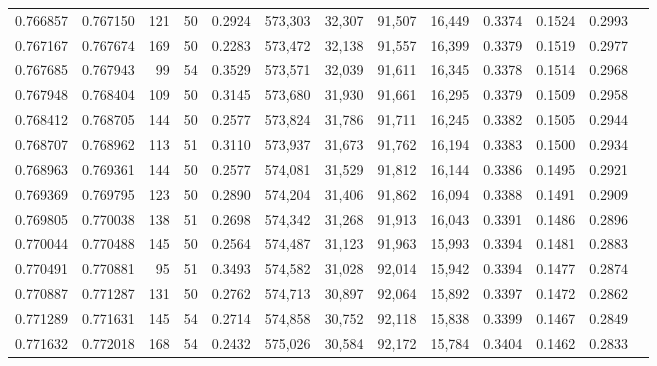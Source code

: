 \begin{tabular}{rrrrrrrrrrrrr}
0.766857 & 0.767150 &   121 &  50 &                                     0.2924 & 573,303 &  32,307 &  91,507 &  16,449 & 0.3374 & 0.1524 & 0.2993 \\
0.767167 & 0.767674 &   169 &  50 &                                     0.2283 & 573,472 &  32,138 &  91,557 &  16,399 & 0.3379 & 0.1519 & 0.2977 \\
0.767685 & 0.767943 &    99 &  54 &                                     0.3529 & 573,571 &  32,039 &  91,611 &  16,345 & 0.3378 & 0.1514 & 0.2968 \\
0.767948 & 0.768404 &   109 &  50 &                                     0.3145 & 573,680 &  31,930 &  91,661 &  16,295 & 0.3379 & 0.1509 & 0.2958 \\
0.768412 & 0.768705 &   144 &  50 &                                     0.2577 & 573,824 &  31,786 &  91,711 &  16,245 & 0.3382 & 0.1505 & 0.2944 \\
0.768707 & 0.768962 &   113 &  51 &                                     0.3110 & 573,937 &  31,673 &  91,762 &  16,194 & 0.3383 & 0.1500 & 0.2934 \\
0.768963 & 0.769361 &   144 &  50 &                                     0.2577 & 574,081 &  31,529 &  91,812 &  16,144 & 0.3386 & 0.1495 & 0.2921 \\
0.769369 & 0.769795 &   123 &  50 &                                     0.2890 & 574,204 &  31,406 &  91,862 &  16,094 & 0.3388 & 0.1491 & 0.2909 \\
0.769805 & 0.770038 &   138 &  51 &                                     0.2698 & 574,342 &  31,268 &  91,913 &  16,043 & 0.3391 & 0.1486 & 0.2896 \\
0.770044 & 0.770488 &   145 &  50 &                                     0.2564 & 574,487 &  31,123 &  91,963 &  15,993 & 0.3394 & 0.1481 & 0.2883 \\
0.770491 & 0.770881 &    95 &  51 &                                     0.3493 & 574,582 &  31,028 &  92,014 &  15,942 & 0.3394 & 0.1477 & 0.2874 \\
0.770887 & 0.771287 &   131 &  50 &                                     0.2762 & 574,713 &  30,897 &  92,064 &  15,892 & 0.3397 & 0.1472 & 0.2862 \\
0.771289 & 0.771631 &   145 &  54 &                                     0.2714 & 574,858 &  30,752 &  92,118 &  15,838 & 0.3399 & 0.1467 & 0.2849 \\
0.771632 & 0.772018 &   168 &  54 &                                     0.2432 & 575,026 &  30,584 &  92,172 &  15,784 & 0.3404 & 0.1462 & 0.2833 \\

\end{tabular}

